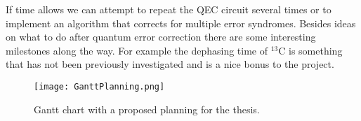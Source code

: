 If time allows we can attempt to repeat the QEC circuit several times or to implement an algorithm that corrects for multiple error syndromes. Besides ideas on what to do after quantum error correction there are some interesting milestones along the way. For example the dephasing time of $^{13}\mathrm{C}$ is something that has not been previously investigated and is a nice bonus to the project. 

\begin{figure}[htbp]
\centering
\texttt{[image: GanttPlanning.png]}
\caption{Gantt chart with a proposed planning for the thesis. }
\label{fig:gantt}
\end{figure}






